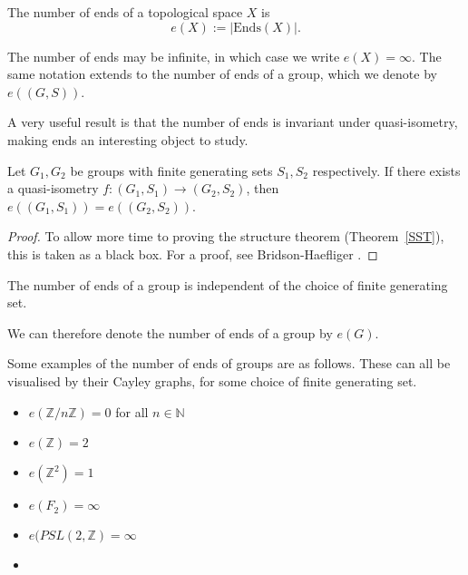 \begin{definition}
    The number of ends of a topological space \(X\) is 
    \[
        e(X) := |\mathrm{Ends}(X)|.
    \]
\end{definition}

The number of ends may be infinite, in which case we write \(e(X) = \infty\). The same notation extends to the number of ends of a group, which we denote by \(e((G,S))\). 

A very useful result is that the number of ends is invariant under quasi-isometry, making ends an interesting object to study. 

\begin{theorem}
    Let \(G_1,G_2\) be groups with finite generating sets \(S_1,S_2\) respectively. If there exists a quasi-isometry \(f: (G_1, S_1) \to (G_2,S_2)\), then \(e((G_1,S_1)) = e((G_2,S_2))\).
\end{theorem}

\begin{proof}
    To allow more time to proving the structure theorem (Theorem~\ref{SST}), this is taken as a black box. For a proof, see Bridson-Haefliger \cite[p.~145]{bridson_haefliger_metric_1999}.
\end{proof}

\begin{corollary}
    The number of ends of a group is independent of the choice of finite generating set.
\end{corollary}

We can therefore denote the number of ends of a group by \(e(G)\). 

\begin{example}
    Some examples of the number of ends of groups are as follows. These can all be visualised by their Cayley graphs, for some choice of finite generating set.
    \begin{itemize}
        \item \(e(\mathbb{Z}/n\mathbb{Z}) = 0\) for all \(n \in \mathbb{N}\)
        \item \(e(\mathbb{Z}) = 2\)
        \item \(e(\mathbb{Z}^2) = 1\)
        \item \(e(F_2) = \infty\)
        \item \(e(PSL(2,\mathbb{Z}) = \infty\)
        \item 
    \end{itemize}
\end{example}

